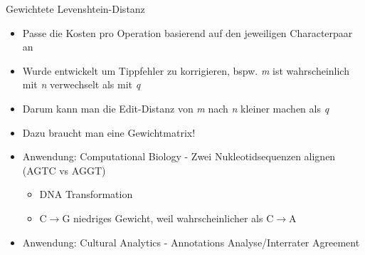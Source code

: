 \documentclass[aspectratio=169]{beamer}
\begin{document}
\begin{frame}{Gewichtete Levenshtein-Distanz}
\begin{itemize}
\item Passe die Kosten pro Operation basierend auf den jeweiligen Characterpaar an
\item Wurde entwickelt um Tippfehler zu korrigieren, bspw. \emph{m} ist wahrscheinlich mit \emph{n} verwechselt als mit \emph{q}
\item Darum kann man die Edit-Distanz von \emph{m} nach \emph{n} kleiner machen als \emph{q}
\item Dazu braucht man eine Gewichtmatrix!
\item Anwendung: Computational Biology - Zwei Nukleotidsequenzen alignen (AGTC vs AGGT)
    \begin{itemize}
        \item DNA Transformation
        \item C$\rightarrow$G niedriges Gewicht, weil wahrscheinlicher als  C$\rightarrow$A
    \end{itemize} 
\item Anwendung: Cultural Analytics - Annotations Analyse/Interrater Agreement %
\end{itemize}
\end{frame}
\end{document}
